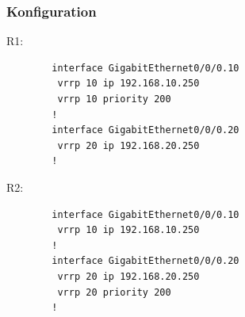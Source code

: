 \documentclass[a4paper, ngerman]{article}
\begin{document}
\subsubsection{Konfiguration}
R1:
\begin{framed}
    \begin{verbatim}
        interface GigabitEthernet0/0/0.10
         vrrp 10 ip 192.168.10.250
         vrrp 10 priority 200
        !
        interface GigabitEthernet0/0/0.20
         vrrp 20 ip 192.168.20.250
        !
    \end{verbatim}
\end{framed}

R2:
\begin{framed}
    \begin{verbatim}
        interface GigabitEthernet0/0/0.10
         vrrp 10 ip 192.168.10.250
        !
        interface GigabitEthernet0/0/0.20
         vrrp 20 ip 192.168.20.250
         vrrp 20 priority 200
        !
    \end{verbatim}
\end{framed}
\end{document}
